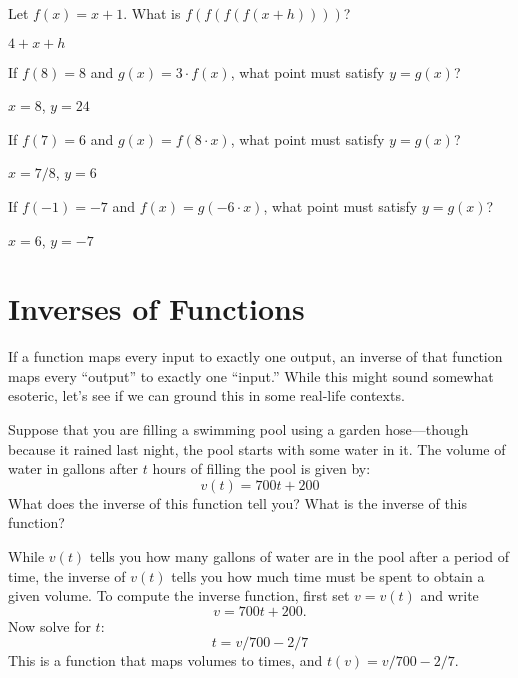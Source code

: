\begin{exercises}
\begin{exercise} Let $f(x) = x+1$. What is $f(f(f(f(x+h))))$?
\begin{answer}
$4+x+h$
\end{answer}
\end{exercise}

\begin{exercise} 
If $f(8) = 8$ and $g(x)=3\cdot f(x)$, what point must satisfy $y=g(x)$?
\begin{answer}
$x=8$, $y=24$
\end{answer}
\end{exercise}

\begin{exercise} 
If $f(7) = 6$ and $g(x)=f(8\cdot x)$, what point must satisfy $y=g(x)$?
\begin{answer}
$x=7/8$, $y=6$
\end{answer}
\end{exercise}

\begin{exercise} 
If $f(-1) = -7$ and $f(x)=g(-6\cdot x)$, what point must satisfy
$y=g(x)$?
\begin{answer}
$x=6$, $y=-7$
\end{answer}
\end{exercise}

\end{exercises}








\section{Inverses of Functions}


If a function maps every input to exactly one output, an inverse of that
function maps every ``output'' to exactly one ``input.'' While this
might sound somewhat esoteric, let's see if we can ground this in
some real-life contexts.

\begin{example}
Suppose that you are filling a swimming pool using a garden
hose---though because it rained last night, the pool starts with some
water in it. The volume of water in gallons after $t$ hours of
filling the pool is given by:
\[
v(t) = 700t + 200
\]
What does the inverse of this function tell you? What is the inverse
of this function?
\end{example}


\begin{solution}
While $v(t)$ tells you how many gallons of water are in the pool after
a period of time, the inverse of $v(t)$ tells you how much time must
be spent to obtain a given volume. To compute the inverse function,
first set $v=v(t)$ and write
\[
v = 700t + 200.
\]
Now solve for $t$:
\[
t = v/700 - 2/7
\]
This is a function that maps volumes to times, and 
$t(v) = v/700-2/7$.
\end{solution}


